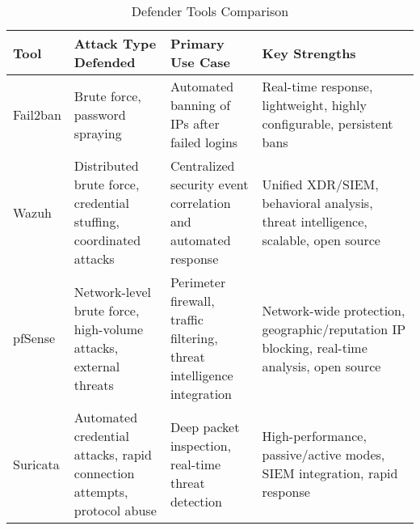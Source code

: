 \begin{table}[h!]
\centering
\begin{tabularx}{\textwidth}{|>{\raggedright\arraybackslash}X|>{\raggedright\arraybackslash}X|>{\raggedright\arraybackslash}X|>{\raggedright\arraybackslash}X|}
\hline
\textbf{Tool} & \textbf{Attack Type Defended} & \textbf{Primary Use Case} & \textbf{Key Strengths} \\
\hline
Fail2ban & Brute force, password spraying & Automated banning of IPs after failed logins & Real-time response, lightweight, highly configurable, persistent bans \\
\hline
Wazuh & Distributed brute force, credential stuffing, coordinated attacks & Centralized security event correlation and automated response & Unified XDR/SIEM, behavioral analysis, threat intelligence, scalable, open source \\
\hline
pfSense & Network-level brute force, high-volume attacks, external threats & Perimeter firewall, traffic filtering, threat intelligence integration & Network-wide protection, geographic/reputation IP blocking, real-time analysis, open source \\
\hline
Suricata & Automated credential attacks, rapid connection attempts, protocol abuse & Deep packet inspection, real-time threat detection & High-performance, passive/active modes, SIEM integration, rapid response \\
\hline
\end{tabularx}
\caption{Defender Tools Comparison}
\label{tab:envtools}
\end{table}
